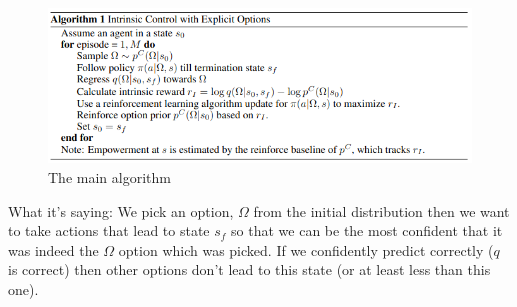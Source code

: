 \documentclass{article}
\begin{document}
\begin{figure}[!ht]
  \includegraphics[width=190mm]{images/algorithm.png}
  \caption{The main algorithm}
\end{figure}

What it's saying:
We pick an option, \(\Omega\) from the initial distribution then we want to take actions that lead to state \(s_{f}\) so that we can be the most confident that it was indeed the \(\Omega\) option which was picked. If we confidently predict correctly (\(q\) is correct) then other options don't lead to this state (or at least less than this one).
\end{document}
